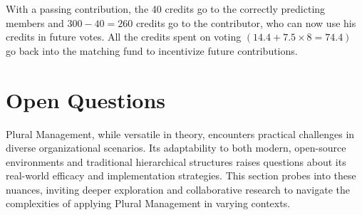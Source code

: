 \documentclass{article}
\begin{document}
With a passing contribution, the 40 credits go to the correctly predicting members and $300 - 40 = 260$ credits go to the contributor, who can now use his credits in future votes. All the credits spent on voting $(14.4 + 7.5 \times 8 = 74.4)$ go back into the matching fund to incentivize future contributions.

\section{Open Questions}
Plural Management, while versatile in theory, encounters practical challenges in diverse organizational scenarios. Its adaptability to both modern, open-source environments and traditional hierarchical structures raises questions about its real-world efficacy and implementation strategies. This section probes into these nuances, inviting deeper exploration and collaborative research to navigate the complexities of applying Plural Management in varying contexts.
\end{document}
